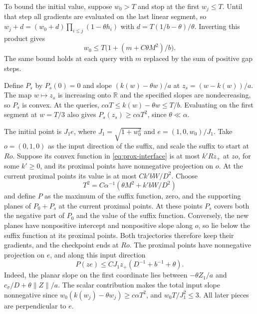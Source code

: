 \documentclass[11pt]{article}
\theoremstyle{definition}
\begin{document}
To bound the initial value, suppose $w_0>T$ and stop at the first $w_j\le T$. Until that step all gradients are evaluated on the last linear segment, so $w_j+d=(w_0+d)\prod_{i\le j}(1-\theta h_i)$ with $d=T(1/b-\theta)/\theta$. Inverting this product gives
\begin{equation}\label{eq:physical-clock}
 w_0\le T\bigl(1+(m+C\theta M^2)/b\bigr).
\end{equation}
The same bound holds at each query with $m$ replaced by the sum of positive gap steps.

Define $P_s$ by $P_s(0)=0$ and slope $(k(w)-\theta w)/a$ at $z_s=(w-k(w))/a$. The map $w\mapsto z_s$ is increasing onto $\mathbb R$ and the specified slopes are nondecreasing, so $P_s$ is convex. At the queries, $c\alpha T\le k(w)-\theta w\le T/b$. Evaluating on the first segment at $w=T/3$ also gives $P_s(z_s)\ge c\alpha T^2$, since $\theta\ll\alpha$.

The initial point is $J_1 e$, where $J_1=\sqrt{1+w_0^2}$ and $e=(1,0,w_0)/J_1$. Take $o=(0,1,0)$ as the input direction of the suffix, and scale the suffix to start at $Ro$. Suppose its convex function in \eqref{eq:prox-interface} is at most $k'Rz_+$ at $zo$, for some $k'\ge0$, and its proximal points have nonnegative projection on $o$. At the current proximal points its value is at most $Ck'bW/D^2$. Choose
\begin{equation}\label{eq:physical-amplitude}
 T^2=C\alpha^{-1}(\theta M^2+k'bW/D^2)
\end{equation}
and define $P$ as the maximum of the suffix function, zero, and the supporting planes of $P_0+P_s$ at the current proximal points. At these points $P_s$ covers both the negative part of $P_0$ and the value of the suffix function. Conversely, the new planes have nonpositive intercept and nonpositive slope along $o$, so lie below the suffix function at its proximal points. Both trajectories therefore keep their gradients, and the checkpoint ends at $Ro$. The proximal points have nonnegative projection on $e$, and along this input direction
\begin{equation}\label{eq:physical-input}
 P(ze)\le C J_1 z_+(D^{-1}+b^{-1}+\theta).
\end{equation}
Indeed, the planar slope on the first coordinate lies between $-\theta Z_1/a$ and $c_\sigma/D+\theta\|Z\|/a$. The scalar contribution makes the total input slope nonnegative since $w_0(k(w_j)-\theta w_j)\ge c\alpha T^2$, and $w_0T/J_1^2\le3$. All later pieces are perpendicular to $e$.
\end{document}
